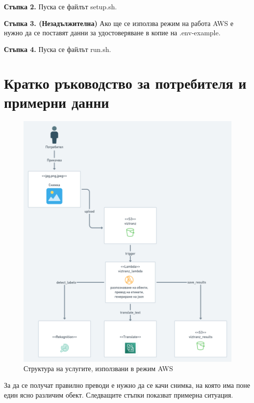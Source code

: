 \documentclass[12pt]{article}
\begin{document}
\noindent\textbf{Стъпка 2.} Пуска се файлът setup.sh.

\medskip

\noindent\textbf{Стъпка 3. (Незадължителна)} Ако ще се използва режим на работа AWS е нужно да се поставят данни за удостоверяване в копие на .env-example.

\medskip

\noindent\textbf{Стъпка 4.} Пуска се файлът run.sh.

\section{Кратко ръководство за потребителя и примерни данни}

\begin{figure}[!htp]
\centering
    \includegraphics[scale=0.28]{assets/ViZTranZ.png}
  \caption{Структура на услугите, използвани в режим AWS}
\end{figure}

\noindent За да се получат правилно преводи е нужно да се качи снимка, на която има поне един ясно различим обект. Следващите стъпки показват примерна ситуация.
\end{document}
